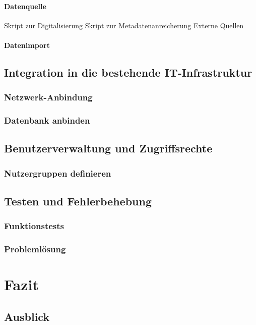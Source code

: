 \documentclass[12pt,a4paper]{report}
\begin{document}
  \subsubsection{Datenquelle}
    Skript zur Digitalisierung
    Skript zur Metadatenanreicherung
    Externe Quellen
  \subsubsection{Datenimport}
\section{Integration in die bestehende IT-Infrastruktur}
  \subsection{Netzwerk-Anbindung}  
  \subsection{Datenbank anbinden}
\section{Benutzerverwaltung und Zugriffsrechte}
  \subsection{Nutzergruppen definieren}
\section{Testen und Fehlerbehebung}
  \subsection{Funktionstests}
  \subsection{Problemlösung}   


\chapter*{Fazit}
\setcounter{section}{0}

\section{Ausblick}
\end{document}
